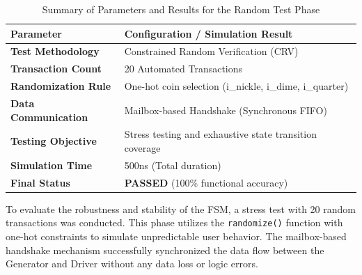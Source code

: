 \begin{table}[H]
	\centering
	\small
	\renewcommand{\arraystretch}{1.5}
	\begin{tabularx}{\textwidth}{|l|X|}
		\hline
		\textbf{Parameter} & \textbf{Configuration / Simulation Result} \\ \hline
		\textbf{Test Methodology} & Constrained Random Verification (CRV) \\ \hline
		\textbf{Transaction Count} & 20 Automated Transactions \\ \hline
		\textbf{Randomization Rule} & One-hot coin selection ({i\_nickle, i\_dime, i\_quarter}) \\ \hline
		\textbf{Data Communication} & Mailbox-based Handshake (Synchronous FIFO) \\ \hline
		\textbf{Testing Objective} & Stress testing and exhaustive state transition coverage \\ \hline
		\textbf{Simulation Time} & 500ns (Total duration) \\ \hline
		\textbf{Final Status} & \textbf{PASSED} (100\% functional accuracy) \\ \hline
	\end{tabularx}
	\caption{Summary of Parameters and Results for the Random Test Phase}
	\label{tab:random_test_summary}
\end{table}
\newpage
To evaluate the robustness and stability of the FSM, a stress test with 20 random transactions was conducted. This phase utilizes the \texttt{randomize()} function with one-hot constraints to simulate unpredictable user behavior. The mailbox-based handshake mechanism successfully synchronized the data flow between the Generator and Driver without any data loss or logic errors.


